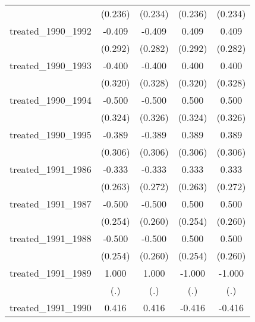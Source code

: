 {\begin{tabular}{l*{4}{c}}
            &     (0.236)         &     (0.234)         &     (0.236)         &     (0.234)         \\
[1em]
treated\_1990\_1992&      -0.409         &      -0.409         &       0.409         &       0.409         \\
            &     (0.292)         &     (0.282)         &     (0.292)         &     (0.282)         \\
[1em]
treated\_1990\_1993&      -0.400         &      -0.400         &       0.400         &       0.400         \\
            &     (0.320)         &     (0.328)         &     (0.320)         &     (0.328)         \\
[1em]
treated\_1990\_1994&      -0.500         &      -0.500         &       0.500         &       0.500         \\
            &     (0.324)         &     (0.326)         &     (0.324)         &     (0.326)         \\
[1em]
treated\_1990\_1995&      -0.389         &      -0.389         &       0.389         &       0.389         \\
            &     (0.306)         &     (0.306)         &     (0.306)         &     (0.306)         \\
[1em]
treated\_1991\_1986&      -0.333         &      -0.333         &       0.333         &       0.333         \\
            &     (0.263)         &     (0.272)         &     (0.263)         &     (0.272)         \\
[1em]
treated\_1991\_1987&      -0.500\sym{*}  &      -0.500         &       0.500\sym{*}  &       0.500         \\
            &     (0.254)         &     (0.260)         &     (0.254)         &     (0.260)         \\
[1em]
treated\_1991\_1988&      -0.500\sym{*}  &      -0.500         &       0.500\sym{*}  &       0.500         \\
            &     (0.254)         &     (0.260)         &     (0.254)         &     (0.260)         \\
[1em]
treated\_1991\_1989&       1.000         &       1.000         &      -1.000         &      -1.000         \\
            &         (.)         &         (.)         &         (.)         &         (.)         \\
[1em]
treated\_1991\_1990&       0.416\sym{**} &       0.416\sym{**} &      -0.416\sym{**} &      -0.416\sym{**} \\

\end{tabular}}
